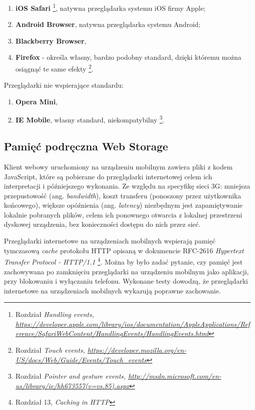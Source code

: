 \begin{enumerate}
  \item \textbf{iOS Safari}\cite{browser-ios-safari} \footnote{\cite{browser-ios-safari} Rozdział \em{Handling events}, \url{https://developer.apple.com/library/ios/documentation/AppleApplications/Reference/SafariWebContent/HandlingEvents/HandlingEvents.html}}, natywna przeglądarka systemu iOS firmy Apple;
  \item \textbf{Android Browser}, natywna przeglądarka systemu Android;
  \item \textbf{Blackberry Browser},
  \item \textbf{Firefox} - określa własny, bardzo podobny standard, dzięki któremu można osiągnąć te same efekty\cite{browser-firefox} \footnote{\cite{browser-firefox} Rozdział \em{Touch events}, \url{https://developer.mozilla.org/en-US/docs/Web/Guide/Events/Touch_events}}.
\end{enumerate}

Przeglądarki nie wspierające standardu:

\begin{enumerate}
  \item \textbf{Opera Mini},
  \item \textbf{IE Mobile}, własny standard, niekompatybilny\cite{browser-ie} \footnote{\cite{browser-ie} Rozdział \em{Pointer and gesture events}, \url{http://msdn.microsoft.com/en-us/library/ie/hh673557(v=vs.85).aspx}}.
\end{enumerate}

\subsection{Pamięć podręczna Web Storage}
\label{subsub:webstorage}

Klient webowy uruchomiony na urządzeniu mobilnym zawiera pliki z kodem JavaScript, które są pobierane do przeglądarki internetowej celem ich interpretacji i późniejszego wykonania. Ze względu na specyfikę sieci 3G: mniejsza przepustowość (ang. \emph{bandwidth}), koszt transferu (ponoszony przez użytkownika końcowego), większe opóźnienia (ang. \emph{latency}) niezbędnym jest zapamiętywanie lokalnie pobranych plików, celem ich ponownego otwarcia z lokalnej przestrzeni dyskowej urządzenia, bez konieczności dostępu do nich przez sieć.

Przeglądarki internetowe na urządzeniach mobilnych wspierają pamięć tymczasową \emph{cache} protokołu HTTP opisaną w dokumencie RFC-2616 \emph{Hypertext Transfer Protocol - HTTP/1.1}\cite{http-rfc} \footnote{Rozdział 13, \emph{Caching in HTTP}}. Można by było zadać pytanie, czy pamięć jest zachowywana po zamknięciu przeglądarki na urządzeniu mobilnym jako aplikacji, przy blokowaniu i wyłączaniu telefonu. Wykonane testy dowodzą, że przeglądarki internetowe na urządzeniach mobilnych wykazują poprawne zachowanie\cite{http-cache-mobile-benchmark}.

